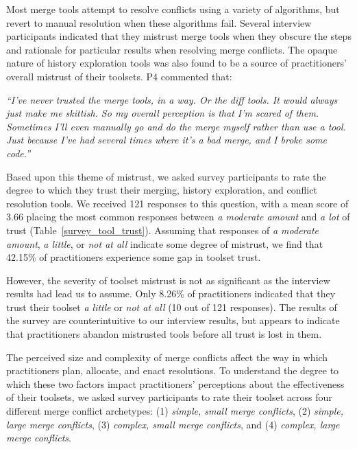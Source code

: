 Most merge tools attempt to resolve conflicts using a variety of algorithms, but revert to manual resolution when these algorithms fail.
Several interview participants indicated that they mistrust merge tools when they obscure the steps and rationale for particular results when resolving merge conflicts.
The opaque nature of history exploration tools was also found to be a source of practitioners' overall mistrust of their toolsets.
P4 commented that:
\begin{displayquote}
\textit{``I've never trusted the merge tools, in a way. Or the diff tools. It would always just make me skittish. So my overall perception is that I'm scared of them. Sometimes I'll even manually go and do the merge myself rather than use a tool. Just because I've had several times where it's a bad merge, and I broke some code.''}
\end{displayquote}

Based upon this theme of mistrust, we asked survey participants to rate the degree to which they trust their merging, history exploration, and conflict resolution tools.
We received 121 responses to this question, with a mean score of 3.66 placing the most common responses between \textit{a moderate amount} and \textit{a lot} of trust (Table~\ref{survey_tool_trust}).
Assuming that responses of \textit{a moderate amount}, \textit{a little}, or \textit{not at all} indicate some degree of mistrust, we find that 42.15\% of practitioners experience some gap in toolset trust.

However, the severity of toolset mistrust is not as significant as the interview results had lead us to assume.
Only 8.26\% of practitioners indicated that they trust their toolset \textit{a little} or \textit{not at all} (10 out of 121 responses).
The results of the survey are counterintuitive to our interview results, but appears to indicate that practitioners abandon mistrusted tools before all trust is lost in them.

The perceived size and complexity of merge conflicts affect the way in which practitioners plan, allocate, and enact resolutions.
To understand the degree to which these two factors impact practitioners' perceptions about the effectiveness of their toolsets, we asked survey participants to rate their toolset across four different merge conflict archetypes: (1) \textit{simple, small merge conflicts}, (2) \textit{simple, large merge conflicts}, (3) \textit{complex, small merge conflicts}, and (4) \textit{complex, large merge conflicts}.

